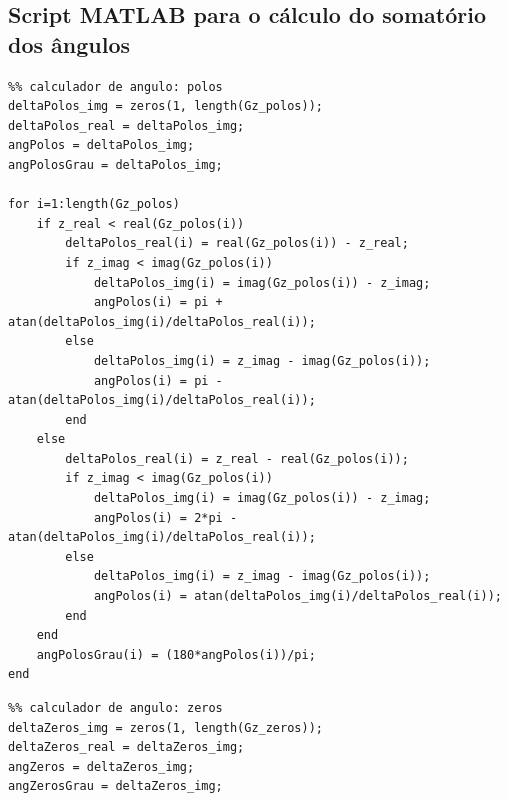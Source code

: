 \documentclass[
	article,			%
	11pt,				%
	oneside,			%
	a4paper,			%
	english,			%
	brazil,				%
	sumario=tradicional
	]{abntex2}
\begin{document}

\begin{apendicesenv}
	
	\partapendices

\chapter{Script MATLAB para o cálculo do somatório dos ângulos}
	\label{app:scriptCalcAng}
\lstset{language=MATLAB}
\begin{lstlisting}
%% calculador de angulo: polos
deltaPolos_img = zeros(1, length(Gz_polos)); 
deltaPolos_real = deltaPolos_img;
angPolos = deltaPolos_img; 
angPolosGrau = deltaPolos_img;

for i=1:length(Gz_polos)
    if z_real < real(Gz_polos(i))
        deltaPolos_real(i) = real(Gz_polos(i)) - z_real;        
        if z_imag < imag(Gz_polos(i))
            deltaPolos_img(i) = imag(Gz_polos(i)) - z_imag;
            angPolos(i) = pi + atan(deltaPolos_img(i)/deltaPolos_real(i));
        else
            deltaPolos_img(i) = z_imag - imag(Gz_polos(i));
            angPolos(i) = pi - atan(deltaPolos_img(i)/deltaPolos_real(i));
        end           
    else
        deltaPolos_real(i) = z_real - real(Gz_polos(i));          
        if z_imag < imag(Gz_polos(i))
            deltaPolos_img(i) = imag(Gz_polos(i)) - z_imag;
            angPolos(i) = 2*pi - atan(deltaPolos_img(i)/deltaPolos_real(i));
        else
            deltaPolos_img(i) = z_imag - imag(Gz_polos(i));
            angPolos(i) = atan(deltaPolos_img(i)/deltaPolos_real(i));
        end                
    end 
    angPolosGrau(i) = (180*angPolos(i))/pi;
end
\end{lstlisting}

\lstset{language=MATLAB}
\begin{lstlisting}
%% calculador de angulo: zeros
deltaZeros_img = zeros(1, length(Gz_zeros)); 
deltaZeros_real = deltaZeros_img;
angZeros = deltaZeros_img; 
angZerosGrau = deltaZeros_img;


\end{lstlisting}
\end{apendicesenv}
\end{document}
